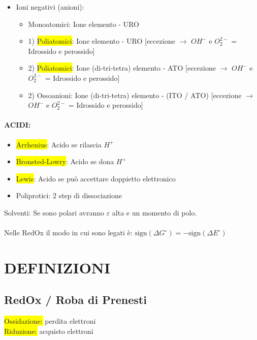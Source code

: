 \documentclass{article}
\begin{document}
\begin{itemize}
	\item Ioni negativi (anioni): 
	\begin{itemize}
		\item Monoatomici: Ione elemento - URO
		\item 1) \colorbox{yellow}{Poliatomici}: Ione elemento - URO [eccezione $\rightarrow$ $OH^-$ e $O_2^{2-}$ = Idrossido e perossido]
		\item 2) \colorbox{yellow}{Poliatomici}: Ione (di-tri-tetra) elemento - ATO [eccezione $\rightarrow$ $OH^-$ e $O_2^{2-}$ = Idrossido e perossido]
		\item 2) Ossoanioni: Ione (di-tri-tetra) elemento - (ITO / ATO) [eccezione $\rightarrow$ $OH^-$ e $O_2^{2-}$ = Idrossido e perossido]
	\end{itemize}
\end{itemize}

\paragraph{ACIDI: } 
\begin{itemize}
	\item \colorbox{yellow}{Arrhenius}: Acido se rilascia $H^+$
	\item \colorbox{yellow}{Bronsted-Lowry}: Acido se dona $H^+$
	\item \colorbox{yellow}{Lewis}: Acido se può accettare doppietto elettronico
	\item Poliprotici: 2 step di dissociazione
\end{itemize} 

Solventi: Se sono polari avranno $\varepsilon$ alta e un momento di polo.
\\\\Nelle RedOx il modo in cui sono legati è: $\text{sign}(\Delta G^\circ) = -\text{sign}(\Delta E^\circ)$

\newpage

\section{DEFINIZIONI}

\subsection{RedOx / Roba di Prenesti}
\colorbox{yellow}{Ossidazione:} perdita elettroni\\
\colorbox{yellow}{Riduzione:} acquisto elettroni
\end{document}
